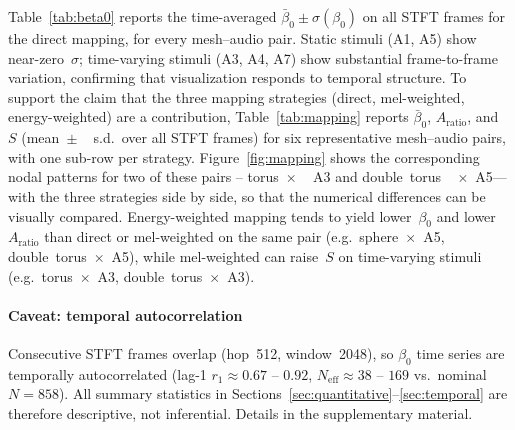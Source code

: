 \documentclass[]{interact}
\theoremstyle{plain}
\theoremstyle{definition}
\theoremstyle{remark}
\begin{document}
Table~\ref{tab:beta0} reports the time-averaged $\bar{\beta}_0 \pm \sigma(\beta_0)$ on all STFT frames for the direct mapping, for every mesh--audio pair. Static stimuli (A1, A5) show near-zero~$\sigma$; time-varying stimuli (A3, A4, A7) show substantial frame-to-frame variation, confirming that visualization responds to temporal structure. To support the claim that the three mapping strategies (direct, mel-weighted, energy-weighted) are a contribution, Table~\ref{tab:mapping} reports $\bar{\beta}_0$, $A_{\mathrm{ratio}}$, and~$S$ (mean~$\pm$ ~ s.d.\ over all STFT frames) for six representative mesh--audio pairs, with one sub-row per strategy. Figure~\ref{fig:mapping} shows the corresponding nodal patterns for two of these pairs -- torus~$\times$ ~ A3 and double~torus ~ $\times$~A5---with the three strategies side by side, so that the numerical differences can be visually compared. Energy-weighted mapping tends to yield lower~$\beta_0$ and lower~$A_{\mathrm{ratio}}$ than direct or mel-weighted on the same pair (e.g.\ sphere~$\times$~A5, double~torus~$\times$~A5), while mel-weighted can raise~$S$ on time-varying stimuli (e.g.\ torus~$\times$~A3, double~torus~$\times$~A3).

\paragraph{Caveat: temporal autocorrelation}
Consecutive STFT frames overlap (hop~512, window~2048), so $\beta_0$ time series are temporally autocorrelated (lag-1 $r_1 \approx 0.67$ -- $0.92$, $N_{\mathrm{eff}} \approx 38$ -- $169$ vs.\ nominal $N=858$). All summary statistics in Sections~\ref{sec:quantitative}--\ref{sec:temporal} are therefore descriptive, not inferential. Details in the supplementary material.
\end{document}
